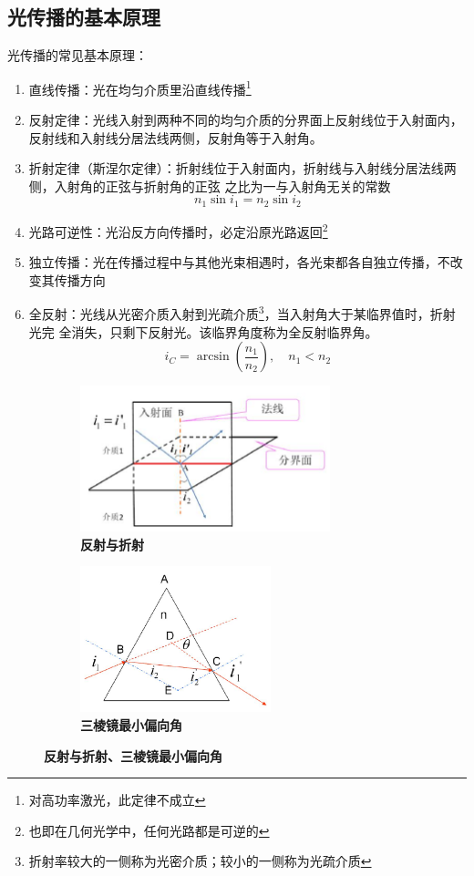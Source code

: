 \documentclass[UTF8]{report}
\theoremstyle{MyLineTheoremStyle} %
\theoremstyle{MyBlockTheoremStyle} %
\theoremstyle{MySubsubsectionStyle} %
\begin{document}
\subsection{光传播的基本原理}

光传播的常见基本原理：
\begin{enumerate}
    \item 直线传播：光在均匀介质里沿直线传播\footnote{对高功率激光，此定律不成立}
    \item 反射定律：光线入射到两种不同的均匀介质的分界面上反射线位于入射面内，反射线和入射线分居法线两侧，反射角等于入射角。
    \item 折射定律（斯涅尔定律）：折射线位于入射面内，折射线与入射线分居法线两侧，入射角的正弦与折射角的正弦
    之比为一与入射角无关的常数
    \begin{equation}
    n_1\sin i_1 = n_2 \sin i_2
    \end{equation}    
    \item 光路可逆性：光沿反方向传播时，必定沿原光路返回\footnote{也即在几何光学中，任何光路都是可逆的}
    \item 独立传播：光在传播过程中与其他光束相遇时，各光束都各自独立传播，不改变其传播方向
    \item 全反射：光线从光密介质入射到光疏介质\footnote{折射率较大的一侧称为光密介质；较小的一侧称为光疏介质}，当入射角大于某临界值时，折射光完
    全消失，只剩下反射光。该临界角度称为全反射临界角。
    \begin{equation}
    i_C = \arcsin (\frac{n_1}{n_2}),\quad n_1<n_2
    \end{equation}
\end{enumerate}

\begin{figure}[H]\centering
\begin{subfigure}[t]{0.5\columnwidth}\centering
    \includegraphics[height=120pt]{assets/1,2/image (44).jpg}
    \caption{\bfseries 反射与折射 }
\end{subfigure}\hfill
\begin{subfigure}[t]{0.5\columnwidth}\centering
    \includegraphics[height=120pt]{assets/1,2/image (45).jpg}
    \caption{\bfseries 三棱镜最小偏向角 }
\end{subfigure}
\caption{\bfseries 反射与折射、三棱镜最小偏向角 }\label{反射与折射、三棱镜最小偏向角}
\end{figure}
\end{document}
